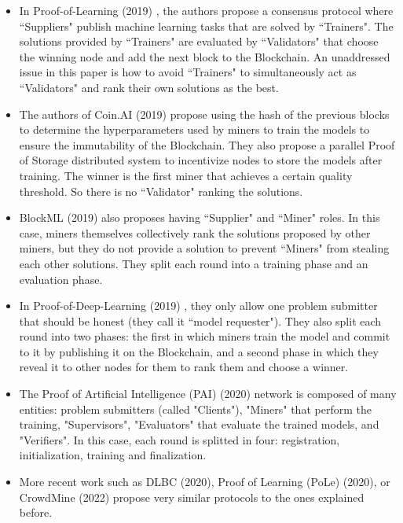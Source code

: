 \documentclass[conference]{IEEEtran}
\begin{document}
    \begin{itemize}
    \item In Proof-of-Learning (2019) \cite{b7}, the authors propose a consensus protocol where ``Suppliers" publish machine learning tasks that are solved by ``Trainers". The solutions provided by ``Trainers" are evaluated by ``Validators" that choose the winning node and add the next block to the Blockchain. An unaddressed issue in this paper is how to avoid ``Trainers" to simultaneously act as ``Validators" and rank their own solutions as the best.
    \item The authors of Coin.AI (2019) \cite{b8} propose using the hash of the previous blocks to determine the hyperparameters used by miners to train the models to ensure the immutability of the Blockchain. They also propose a parallel Proof of Storage distributed system to incentivize nodes to store the models after training. The winner is the first miner that achieves a certain quality threshold. So there is no ``Validator" ranking the solutions.
    \item BlockML (2019) \cite{b9} also proposes having ``Supplier" and ``Miner" roles. In this case, miners themselves collectively rank the solutions proposed by other miners, but they do not provide a solution to prevent ``Miners" from stealing each other solutions. They split each round into a training phase and an evaluation phase.
    \item In Proof-of-Deep-Learning (2019) \cite{b10}, they only allow one problem submitter that should be honest (they call it ``model requester"). They also split each round into two phases: the first in which miners train the model and commit to it by publishing it on the Blockchain, and a second phase in which they reveal it to other nodes for them to rank them and choose a winner.
    \item The Proof of Artificial Intelligence (PAI) (2020) \cite{b11} network is composed of many entities: problem submitters (called "Clients"), "Miners" that perform the training, "Supervisors", "Evaluators" that evaluate the trained models, and "Verifiers". In this case, each round is splitted in four: registration, initialization, training and finalization.
    \item More recent work such as DLBC (2020)\cite{b12}, Proof of Learning (PoLe) (2020)\cite{b13}, or CrowdMine (2022)\cite{b14} propose very similar protocols to the ones explained before.
    
    \end{itemize}
    
\end{document}
